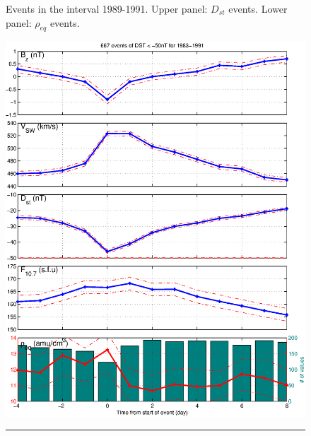 \documentclass[10pt,twocolumn]{article}
\begin{document}
\begin{figure}[tp!]
\caption{Events in the interval 1989-1991. Upper panel: $D_{st}$ events. Lower panel: $\rho_{eq}$ events.}
\label{DailyAverages}
\end{figure}

\begin{figure}[tp!]
\centering
\includegraphics[scale=0.40]{paperfigures/stormavs-dst-day.eps}
\rule[1ex]{5cm}{1pt}

\end{figure}
\end{document}
